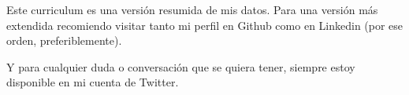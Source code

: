 ﻿Este curriculum es una versión resumida de mis datos. Para una versión más extendida recomiendo visitar tanto mi perfil en Github como en Linkedin (por ese orden, preferiblemente).

Y para cualquier duda o conversación que se quiera tener, siempre estoy disponible en mi cuenta de Twitter.
